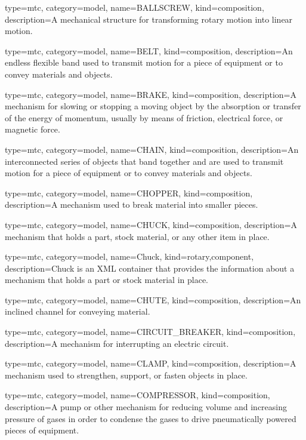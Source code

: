 {
  type=mtc,
  category=model,
  name={BALLSCREW},
  kind={composition},
  description={A mechanical structure for transforming rotary motion into linear motion.}
}


{
  type=mtc,
  category=model,
  name={BELT},
  kind={composition},
  description={An endless flexible band used to transmit motion for a piece of equipment or to convey materials and objects.}
}


{
  type=mtc,
  category=model,
  name={BRAKE},
  kind={composition},
  description={A mechanism for slowing or stopping a moving object by the absorption or transfer of the energy of momentum, usually by means of friction, electrical force, or magnetic force.}
}


{
  type=mtc,
  category=model,
  name={CHAIN},
  kind={composition},
  description={An interconnected series of objects that band together and are used to transmit motion for a piece of equipment or to convey materials and objects.}
}


{
  type=mtc,
  category=model,
  name={CHOPPER},
  kind={composition},
  description={A mechanism used to break material into smaller pieces.}
}


{
  type=mtc,
  category=model,
  name={CHUCK},
  kind={composition},
  description={A mechanism that holds a part, stock material, or any other item in place.}
}


{
  type=mtc,
  category=model,
  name={Chuck},
  kind={rotary,component},
  description={Chuck is an XML container that provides the information about a mechanism that holds a part or stock material in place.}
}


{
  type=mtc,
  category=model,
  name={CHUTE},
  kind={composition},
  description={An inclined channel for conveying material.}
}


{
  type=mtc,
  category=model,
  name={CIRCUIT\_BREAKER},
  kind={composition},
  description={A mechanism for interrupting an electric circuit.}
}


{
  type=mtc,
  category=model,
  name={CLAMP},
  kind={composition},
  description={A mechanism used to strengthen, support, or fasten objects in place.}
}


{
  type=mtc,
  category=model,
  name={COMPRESSOR},
  kind={composition},
  description={A pump or other mechanism for reducing volume and increasing pressure of gases in order to condense the gases to drive pneumatically powered pieces of equipment.}
}


